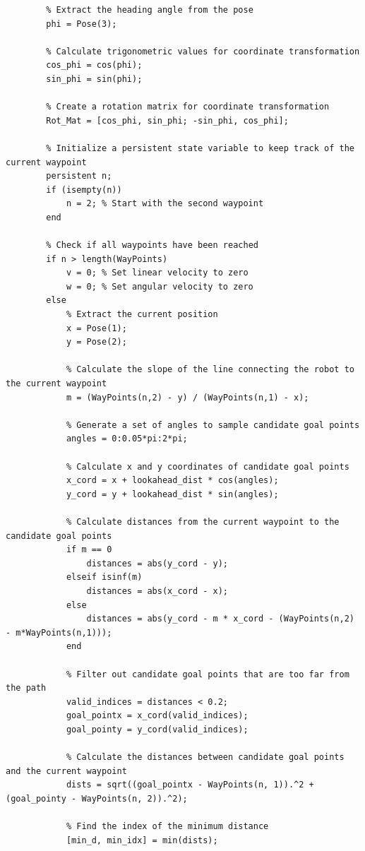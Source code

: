 \documentclass[answers]{exam}
\begin{document}
\begin{questions}
\begin{lstlisting}
        % Extract the heading angle from the pose
        phi = Pose(3);
        
        % Calculate trigonometric values for coordinate transformation
        cos_phi = cos(phi);
        sin_phi = sin(phi);
        
        % Create a rotation matrix for coordinate transformation
        Rot_Mat = [cos_phi, sin_phi; -sin_phi, cos_phi];
    
        % Initialize a persistent state variable to keep track of the current waypoint
        persistent n;
        if (isempty(n))
            n = 2; % Start with the second waypoint
        end
        
        % Check if all waypoints have been reached
        if n > length(WayPoints)
            v = 0; % Set linear velocity to zero
            w = 0; % Set angular velocity to zero
        else
            % Extract the current position
            x = Pose(1);
            y = Pose(2);
            
            % Calculate the slope of the line connecting the robot to the current waypoint
            m = (WayPoints(n,2) - y) / (WayPoints(n,1) - x);
            
            % Generate a set of angles to sample candidate goal points
            angles = 0:0.05*pi:2*pi;
            
            % Calculate x and y coordinates of candidate goal points
            x_cord = x + lookahead_dist * cos(angles);
            y_cord = y + lookahead_dist * sin(angles);
            
            % Calculate distances from the current waypoint to the candidate goal points
            if m == 0
                distances = abs(y_cord - y);
            elseif isinf(m)
                distances = abs(x_cord - x);
            else
                distances = abs(y_cord - m * x_cord - (WayPoints(n,2) - m*WayPoints(n,1)));
            end
            
            % Filter out candidate goal points that are too far from the path
            valid_indices = distances < 0.2;
            goal_pointx = x_cord(valid_indices);
            goal_pointy = y_cord(valid_indices);
    
            % Calculate the distances between candidate goal points and the current waypoint
            dists = sqrt((goal_pointx - WayPoints(n, 1)).^2 + (goal_pointy - WayPoints(n, 2)).^2);
            
            % Find the index of the minimum distance
            [min_d, min_idx] = min(dists);
            

\end{lstlisting}
\end{questions}
\end{document}
